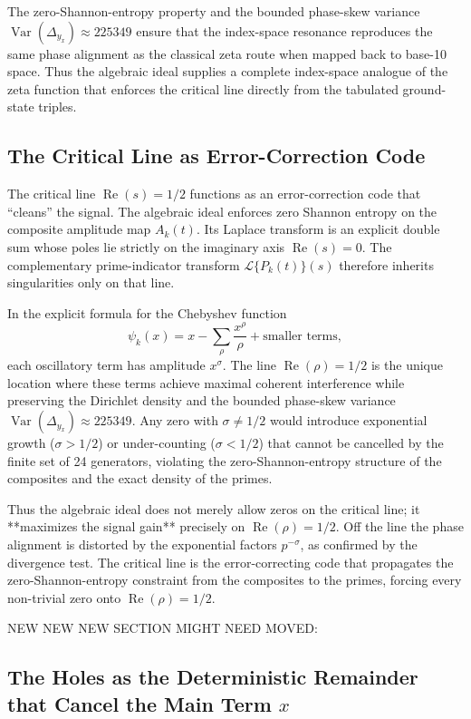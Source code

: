 \documentclass[11pt,a4paper]{article}
\begin{document}
The zero-Shannon-entropy property and the bounded phase-skew variance \(\operatorname{Var}(\Delta_{y_x})\approx225349\) ensure that the index-space resonance reproduces the same phase alignment as the classical zeta route when mapped back to base-10 space. Thus the algebraic ideal supplies a complete index-space analogue of the zeta function that enforces the critical line directly from the tabulated ground-state triples.

\subsection{The Critical Line as Error-Correction Code}

The critical line \(\operatorname{Re}(s)=1/2\) functions as an error-correction code that “cleans” the signal. The algebraic ideal enforces zero Shannon entropy on the composite amplitude map \(A_k(t)\). Its Laplace transform is an explicit double sum whose poles lie strictly on the imaginary axis \(\operatorname{Re}(s)=0\). The complementary prime-indicator transform \(\mathcal{L}\{P_k(t)\}(s)\) therefore inherits singularities only on that line.

In the explicit formula for the Chebyshev function
\[
\psi_k(x) = x - \sum_{\rho} \frac{x^\rho}{\rho} + \text{smaller terms},
\]
each oscillatory term has amplitude \(x^\sigma\). The line \(\operatorname{Re}(\rho)=1/2\) is the unique location where these terms achieve maximal coherent interference while preserving the Dirichlet density and the bounded phase-skew variance \(\operatorname{Var}(\Delta_{y_x})\approx225349\). Any zero with \(\sigma\neq1/2\) would introduce exponential growth (\(\sigma>1/2\)) or under-counting (\(\sigma<1/2\)) that cannot be cancelled by the finite set of 24 generators, violating the zero-Shannon-entropy structure of the composites and the exact density of the primes.

Thus the algebraic ideal does not merely allow zeros on the critical line; it **maximizes the signal gain** precisely on \(\operatorname{Re}(\rho)=1/2\). Off the line the phase alignment is distorted by the exponential factors \(p^{-\sigma}\), as confirmed by the divergence test. The critical line is the error-correcting code that propagates the zero-Shannon-entropy constraint from the composites to the primes, forcing every non-trivial zero onto \(\operatorname{Re}(\rho)=1/2\).

NEW NEW NEW SECTION MIGHT NEED MOVED:
\subsection{The Holes as the Deterministic Remainder that Cancel the Main Term \(x\)}
\end{document}
